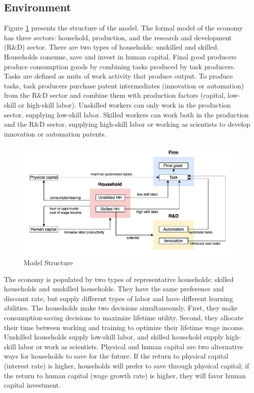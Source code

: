 \documentclass[12pt]{article}
\begin{document}
\subsection{Environment}
Figure \ref{model} presents the structure of the model. The formal model of the economy has three sectors: household, production, and the research and development (R\&D) sector. There are two types of households: unskilled and skilled. Households consume, save and invest in human capital. Final good producers produce consumption goods by combining tasks produced by task producers. Tasks are defined as units of work activity that produce output. To produce tasks, task producers purchase patent intermediates (innovation or automation) from the R\&D sector and combine them with production factors (capital, low-skill or high-skill labor). Unskilled workers can only work in the production sector, supplying low-skill labor. Skilled workers can work both in the production and the R\&D sector, supplying high-skill labor or working as scientists to develop innovation or automation patents. 

\begin{figure}[h!]
\includegraphics[width = \textwidth]{Model}
\caption{Model Structure}
\label{model}
\end{figure}

The economy is populated by two types of representative households: skilled households and unskilled households. They have the same preference and discount rate, but supply different types of labor and have different learning abilities. The households make two decisions simultaneously. First, they make consumption-saving decisions to maximize lifetime utility. Second, they allocate their time between working and training to optimize their lifetime wage income. Unskilled households supply low-skill labor, and skilled household supply high-skill labor or work as scientists. Physical and human capital are two alternative ways for households to save for the future. If the return to physical capital (interest rate) is higher, households will prefer to save through physical capital; if the return to human capital (wage growth rate) is higher, they will favor human capital investment. 
\end{document}
